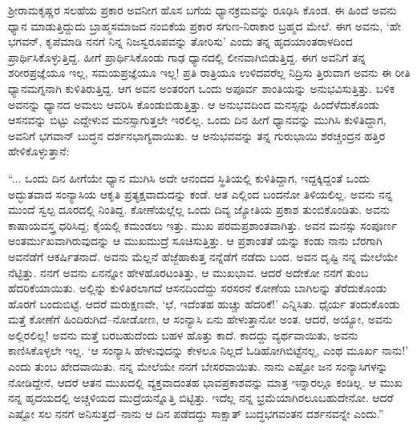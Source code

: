 ಶ್ರೀರಾಮಕೃಷ್ಣರ ಸಲಹೆಯ ಪ್ರಕಾರ ಅವನೀಗ ಹೊಸ ಬಗೆಯ ಧ್ಯಾನಕ್ರಮವನ್ನು ರೂಢಿಸಿ ಕೊಂಡ. ಈ ಹಿಂದೆ ಅವನು ಧ್ಯಾನ ಮಾಡುತ್ತಿದ್ದುದು ಬ್ರಾಹ್ಮಸಮಾಜದ ನಂಬಿಕೆಯ ಪ್ರಕಾರ ಸಗುಣ-ನಿರಾಕಾರ ಬ್ರಹ್ಮದ ಮೇಲೆ. ಈಗ ಅವನು, ‘ಹೇ ಭಗವನ್, ಕೃಪೆಮಾಡಿ ನನಗೆ ನಿನ್ನ ನಿಜಸ್ವರೂಪವನ್ನು ತೋರಿಸು’ ಎಂದು ತನ್ನ ಹೃದಯಾಂತರಾಳದಿಂದ ಪ್ರಾರ್ಥಿಸಿಕೊಳ್ಳುತ್ತಿದ್ದ. ಹೀಗೆ ಪ್ರಾರ್ಥಿಸಿಕೊಂಡು ಗಾಢ ಧ್ಯಾನದಲ್ಲಿ ಲೀನವಾಗಿಬಿಡುತ್ತಿದ್ದ. ಈಗ ಅವನಿಗೆ ತನ್ನ ಶರೀರಪ್ರಜ್ಞೆಯೂ ಇಲ್ಲ, ಸಮಯಪ್ರಜ್ಞೆಯೂ ಇಲ್ಲ! ಪ್ರತಿ ರಾತ್ರಿಯೂ ಉಳಿದವರೆಲ್ಲ ನಿದ್ರಿಸು ತ್ತಿರುವಾಗ ಅವನು ಈ ರೀತಿ ಧ್ಯಾನಮಗ್ನನಾಗಿ ಕುಳಿತಿರುತ್ತಿದ್ದ. ಆಗ ಅವನ ಅಂತರಂಗ ಒಂದು ಅಪೂರ್ವ ಶಾಂತಿಯನ್ನು ಅನುಭವಿಸುತ್ತಿತ್ತು. ಬಳಿಕ ಅವನನ್ನು ಧ್ಯಾನದ ಅಮಲು ಆವರಿಸಿ ಕೊಂಡುಬಿಡುತ್ತಿತ್ತು. ಆ ಅನುಭವದಿಂದ ಮನಸ್ಸನ್ನು ಹಿಂದೆಳೆದುಕೊಂಡು ಆಸನವನ್ನು ಬಿಟ್ಟು ಎದ್ದೇಳುವ ಮನಸ್ಸಾಗುತ್ತಲೇ ಇರಲಿಲ್ಲ. ಒಂದು ದಿನ ಹೀಗೆ ಧ್ಯಾನವನ್ನು ಮುಗಿಸಿ ಕುಳಿತಿದ್ದಾಗ, ಅವನಿಗೆ ಭಗವಾನ್ ಬುದ್ಧನ ದರ್ಶನಭಾಗ್ಯವಾಯಿತು. ಆ ಅನುಭವವನ್ನು ತನ್ನ ಗುರುಭಾಯಿ ಶರಚ್ಚಂದ್ರನ ಹತ್ತಿರ ಹೇಳಿಕೊಳ್ಳುತ್ತಾನೆ:

“... ಒಂದು ದಿನ ಹೀಗೆಯೇ ಧ್ಯಾನ ಮುಗಿಸಿ ಅದೇ ಆನಂದದ ಸ್ಥಿತಿಯಲ್ಲಿ ಕುಳಿತಿದ್ದಾಗ, ಇದ್ದಕ್ಕಿದ್ದಂತೆ ಒಂದು ಅದ್ಭುತವಾದ ಸಂನ್ಯಾಸಿಯ ಆಕೃತಿ ಪ್ರತ್ಯಕ್ಷವಾದುದನ್ನು ಕಂಡೆ. ಆತ ಎಲ್ಲಿಂದ ಬಂದನೋ ತಿಳಿಯಲಿಲ್ಲ. ಅವನು ನನ್ನ ಮುಂದೆ ಸ್ವಲ್ಪ ದೂರದಲ್ಲಿ ನಿಂತಿದ್ದ. ಕೋಣೆಯಲ್ಲೆಲ್ಲ ಒಂದು ದಿವ್ಯ ಜ್ಯೋತಿಯ ಪ್ರಕಾಶ ತುಂಬಿಕೊಂಡಿತು. ಅವನು ಕಾಷಾಯವಸ್ತ್ರ ಧರಿಸಿದ್ದ; ಕೈಯಲ್ಲಿ ಕಮಂಡಲು ಇತ್ತು. ಮುಖ ಪರಮಪ್ರಶಾಂತವಾಗಿತ್ತು. ಅವನ ಮನಸ್ಸು ಸಂಪೂರ್ಣ ಅಂತರ್ಮುಖವಾಗಿರುವುದನ್ನು ಆ ಮುಖಮುದ್ರೆ ಸೂಚಿಸುತ್ತಿತ್ತು. ಆ ಪ್ರಶಾಂತತೆ ಯನ್ನು ಕಂಡು ನಾನು ಬೆರಗಾಗಿ ಅವನೆಡೆಗೆ ಆಕರ್ಷಿತನಾದೆ. ಅವನು ಮೆಲ್ಲನೆ ಹೆಜ್ಜೆಹಾಕುತ್ತ ನನ್ನೆಡೆಗೆ ನಡೆದು ಬಂದ. ಅವನ ದೃಷ್ಟಿ ನನ್ನ ಮೇಲೆಯೇ ನೆಟ್ಟಿತ್ತು. ನನಗೆ ಅವನು ಏನನ್ನೋ ಹೇಳಹೊರಟಂತಿತ್ತು, ಆ ಮುಖಭಾವ. ಆದರೆ ಅದೇಕೋ ನನಗೆ ತುಂಬ ಹೆದರಿಕೆಯಾಯಿತು. ಅಲ್ಲಿನ್ನು ಕುಳಿತಿರಲಾಗದೆ ಆಸನದಿಂದೆದ್ದು ಸರಸರನೆ ಕೋಣೆಯ ಬಾಗಿಲನ್ನು ತೆರೆದುಕೊಂಡು ಹೊರಗೆ ಬಂದುಬಿಟ್ಟೆ. ಆದರೆ ಮರುಕ್ಷಣವೇ, ‘ಛೆ, ಇದೆಂತಹ ಹುಚ್ಚು ಹೆದರಿಕೆ!’ ಎನ್ನಿಸಿತು. ಧೈರ್ಯ ತಂದುಕೊಂಡು ಮತ್ತೆ ಕೋಣೆಗೆ ಹಿಂದಿರುಗಿದೆ–ನೋಡೋಣ, ಆ ಸಂನ್ಯಾಸಿ ಏನು ಹೇಳುತ್ತಾನೋ ಅಂತ. ಆದರೆ, ಅಯ್ಯೋ, ಅವನು ಅಲ್ಲಿರಲಿಲ್ಲ! ಅವನು ಮತ್ತೆ ಬರಬಹುದೆಂದು ಬಹಳ ಹೊತ್ತು ಕಾದೆ. ಕಾದದ್ದು ವ್ಯರ್ಥವಾಯಿತು, ಅವನು ಕಾಣಿಸಿಕೊಳ್ಳಲೇ ಇಲ್ಲ. ‘ಆ ಸಂನ್ಯಾಸಿ ಹೇಳುವುದನ್ನು ಕೇಳಲೂ ನಿಲ್ಲದೆ ಓಡಿಹೋಗಿಬಿಟ್ಟೆನಲ್ಲ, ಎಂಥ ಮೂರ್ಖ ನಾನು!’ ಎಂದು ತುಂಬ ಖೇದವಾಯಿತು. ನನ್ನ ಮೇಲೆಯೇ ನನಗೆ ಬೇಸರವಾಯಿತು. ನಾನು ಎಷ್ಟೋ ಜನ ಸಂನ್ಯಾಸಿಗಳನ್ನು ನೋಡಿದ್ದೇನೆ, ಆದರೆ ಆತನ ಮುಖದಲ್ಲಿ ವ್ಯಕ್ತವಾದಂತಹ ಭಾವಪ್ರಕಾಶವನ್ನು ಮಾತ್ರ ಇನ್ನಾರಲ್ಲೂ ಕಂಡಿಲ್ಲ. ಆ ಮುಖ ನನ್ನ ಹೃದಯದಲ್ಲಿ ಅಚ್ಚಳಿಯದ ಮುದ್ರೆಯನ್ನೊತ್ತಿ ಬಿಟ್ಟಿತ್ತು. ಇದೆಲ್ಲ ನನ್ನ ಭ್ರಮೆಯಾಗಿರಲೂಬಹುದೇನೋ. ಆದರೆ ಎಷ್ಟೋ ಸಲ ನನಗೆ ಅನಿಸುತ್ತದೆ–ನಾನು ಆ ದಿನ ಪಡೆದದ್ದು ಸಾಕ್ಷಾತ್ ಬುದ್ಧಭಗವಂತನ ದರ್ಶನವನ್ನೇ ಎಂದು.”

